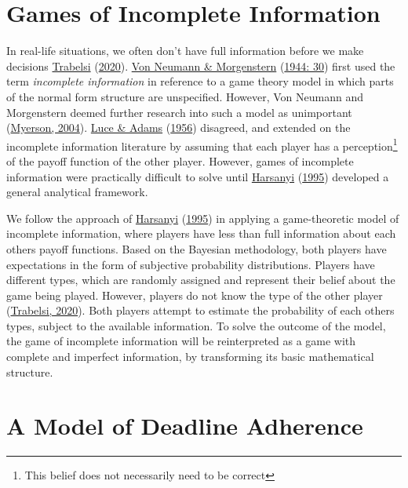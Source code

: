\documentclass[11pt,preprint, authoryear]{elsarticle}
\numberwithin{equation}{section}
\numberwithin{figure}{section}
\numberwithin{table}{section}
\let\rmarkdownfootnote\footnote%
\def\footnote{\protect\rmarkdownfootnote}
\begin{document}
\hypertarget{games-of-incomplete-information}{%
\section{\texorpdfstring{Games of Incomplete Information
\label{lit}}{Games of Incomplete Information }}\label{games-of-incomplete-information}}

In real-life situations, we often don't have full information before we
make decisions \protect\hyperlink{ref-2020games}{Trabelsi}
(\protect\hyperlink{ref-2020games}{2020}).
\protect\hyperlink{ref-von}{Von Neumann \& Morgenstern}
(\protect\hyperlink{ref-von}{1944: 30}) first used the term
\emph{incomplete information} in reference to a game theory model in
which parts of the normal form structure are unspecified. However, Von
Neumann and Morgenstern deemed further research into such a model as
unimportant (\protect\hyperlink{ref-2004com}{Myerson, 2004}).
\protect\hyperlink{ref-luce1956}{Luce \& Adams}
(\protect\hyperlink{ref-luce1956}{1956}) disagreed, and extended on the
incomplete information literature by assuming that each player has a
perception\footnote{This belief does not necessarily need to be correct}
of the payoff function of the other player. However, games of incomplete
information were practically difficult to solve until
\protect\hyperlink{ref-harsanyi}{Harsanyi}
(\protect\hyperlink{ref-harsanyi}{1995}) developed a general analytical
framework.

We follow the approach of \protect\hyperlink{ref-harsanyi}{Harsanyi}
(\protect\hyperlink{ref-harsanyi}{1995}) in applying a game-theoretic
model of incomplete information, where players have less than full
information about each others payoff functions. Based on the Bayesian
methodology, both players have expectations in the form of subjective
probability distributions. Players have different types, which are
randomly assigned and represent their belief about the game being
played. However, players do not know the type of the other player
(\protect\hyperlink{ref-2020games}{Trabelsi, 2020}). Both players
attempt to estimate the probability of each others types, subject to the
available information. To solve the outcome of the model, the game of
incomplete information will be reinterpreted as a game with complete and
imperfect information, by transforming its basic mathematical structure.

\hypertarget{a-model-of-deadline-adherence}{%
\section{\texorpdfstring{A Model of Deadline Adherence
\label{game}}{A Model of Deadline Adherence }}\label{a-model-of-deadline-adherence}}
\end{document}
